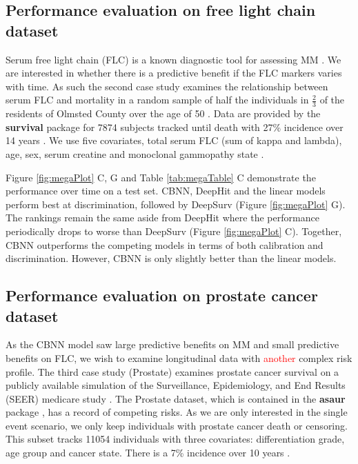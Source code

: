 \documentclass[preprint,12pt,authoryear]{elsarticle}
\begin{document}
\hypertarget{pe-flc}{%
\subsection{Performance evaluation on free light chain dataset}\label{pe-flc}}
Serum free light chain (FLC) is a known diagnostic tool for assessing MM \citep{mm2flc}. We are interested in whether there is a predictive benefit if the FLC markers varies with time. As such the second case study examines the relationship between serum FLC and mortality in a random sample of half the individuals in $\frac{2}{3}$ of the residents of Olmsted County over the age of 50 \citep{flc}. Data are provided by the \textbf{survival} package \citep{survpkg} for 7874 subjects tracked until death with 27\% incidence over 14 years \citep{flc}. We use five covariates, total serum FLC (sum of kappa and lambda), age, sex, serum creatine and monoclonal gammopathy state \citep{flc}.

Figure \ref{fig:megaPlot} C, G and Table \ref{tab:megaTable} C demonstrate the performance over time on a test set. CBNN, DeepHit and the linear models perform best at discrimination, followed by DeepSurv (Figure \ref{fig:megaPlot} G). The rankings remain the same aside from DeepHit where the performance periodically drops to worse than DeepSurv (Figure \ref{fig:megaPlot} C). Together, CBNN outperforms the competing models in terms of both calibration and discrimination. However, CBNN is only slightly better than the linear models.

\hypertarget{pe-prostate}{%
\subsection{Performance evaluation on prostate cancer dataset}\label{pe-prostate}}
As the CBNN model saw large predictive benefits on MM and small predictive benefits on FLC, we wish to examine longitudinal data with \textcolor{red}{another} complex risk profile.
The third case study (Prostate) examines prostate cancer survival on a publicly available simulation of the Surveillance, Epidemiology, and End Results (SEER) medicare study \citep{prostate}.
The Prostate dataset, which is contained in the \textbf{asaur} package \citep{asaur}, has a record of competing risks. As we are only interested in the single event scenario, we only keep individuals with prostate cancer death or censoring. This subset tracks 11054 individuals with three covariates: differentiation grade, age group and cancer state. There is a 7\% incidence over 10 years \citep{prostate}.
\end{document}
